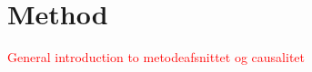 \documentclass[../Thesis.tex]{subfiles}
\begin{document}







\chapter{Method}
\textcolor{red}{General introduction to metodeafsnittet og causalitet}
\end{document}
